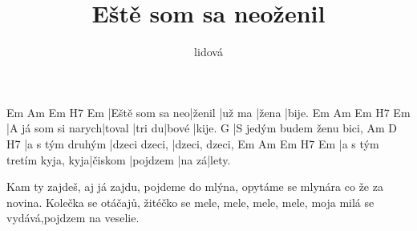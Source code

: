 \documentclass{song}
\title{Eště som sa neoženil}
\author{lidová}
\begin{document}
\strophe
Em              Am     Em     H7    Em
|Eště som sa neo|ženil |už ma |žena |bije.
Em                 Am     Em     H7    Em
|A já som si narych|toval |tri du|bové |kije.
G
|S jedým budem ženu bici,
Am              D             H7
|a s tým druhým |dzeci dzeci, |dzeci, dzeci,
Em                        Am      Em       H7    Em
|a s tým tretím kyja, kyja|čiskom |pojdzem |na zá|lety.
\endstrophe

\strophe*
Kam ty zajdeš, aj já zajdu, pojdeme do mlýna,
opytáme se mlynára co že za novina.
Kolečka se otáčajů,
žitéčko se mele, mele, mele, mele,
moja milá se vydává,pojdzem na veselie.
\endstrophe
\end{document}
